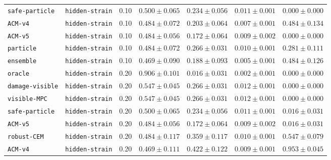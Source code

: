 \documentclass{article}
\begin{document}
\begin{center}
\begin{tabular}{llccccc}
\texttt{safe-particle} & \texttt{hidden-strain} & 0.10 & $0.500 \pm 0.065$ & $0.234 \pm 0.056$ & $0.011 \pm 0.001$ & $0.000 \pm 0.000$ \\
\texttt{ACM-v4} & \texttt{hidden-strain} & 0.10 & $0.484 \pm 0.072$ & $0.203 \pm 0.064$ & $0.007 \pm 0.001$ & $0.484 \pm 0.134$ \\
\texttt{ACM-v5} & \texttt{hidden-strain} & 0.10 & $0.484 \pm 0.056$ & $0.172 \pm 0.064$ & $0.009 \pm 0.002$ & $0.000 \pm 0.000$ \\
\texttt{particle} & \texttt{hidden-strain} & 0.10 & $0.484 \pm 0.072$ & $0.266 \pm 0.031$ & $0.010 \pm 0.001$ & $0.281 \pm 0.111$ \\
\texttt{ensemble} & \texttt{hidden-strain} & 0.10 & $0.469 \pm 0.090$ & $0.188 \pm 0.093$ & $0.005 \pm 0.001$ & $0.484 \pm 0.126$ \\
\texttt{oracle} & \texttt{hidden-strain} & 0.20 & $0.906 \pm 0.101$ & $0.016 \pm 0.031$ & $0.002 \pm 0.001$ & $0.000 \pm 0.000$ \\
\texttt{damage-visible} & \texttt{hidden-strain} & 0.20 & $0.547 \pm 0.045$ & $0.266 \pm 0.031$ & $0.012 \pm 0.001$ & $0.000 \pm 0.000$ \\
\texttt{visible-MPC} & \texttt{hidden-strain} & 0.20 & $0.547 \pm 0.045$ & $0.266 \pm 0.031$ & $0.012 \pm 0.001$ & $0.000 \pm 0.000$ \\
\texttt{safe-particle} & \texttt{hidden-strain} & 0.20 & $0.500 \pm 0.065$ & $0.234 \pm 0.056$ & $0.011 \pm 0.001$ & $0.016 \pm 0.031$ \\
\texttt{ACM-v5} & \texttt{hidden-strain} & 0.20 & $0.484 \pm 0.056$ & $0.172 \pm 0.064$ & $0.009 \pm 0.002$ & $0.016 \pm 0.031$ \\
\texttt{robust-CEM} & \texttt{hidden-strain} & 0.20 & $0.484 \pm 0.117$ & $0.359 \pm 0.117$ & $0.010 \pm 0.001$ & $0.547 \pm 0.079$ \\
\texttt{ACM-v4} & \texttt{hidden-strain} & 0.20 & $0.469 \pm 0.111$ & $0.422 \pm 0.122$ & $0.009 \pm 0.001$ & $0.953 \pm 0.045$ \\
\bottomrule
\end{tabular}
\end{center}
\end{document}
